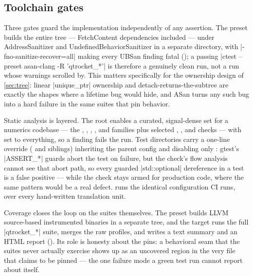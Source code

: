 \subsection{Toolchain gates}\label{sec:verification-toolchain}

Three gates guard the implementation independently of any assertion. The  preset
builds the entire tree --- FetchContent dependencies included --- under
AddressSanitizer and UndefinedBehaviorSanitizer in a separate  directory, with
\cppinline|-fno-sanitize-recover=all| making every UBSan finding fatal
(); a passing \cppinline|ctest --preset asan-clang -R 'qtrocket_*'| is
therefore a genuinely clean run, not a run whose warnings scrolled by. This matters specifically
for the ownership design of \cref{sec:tree}: linear \cppinline|unique_ptr| ownership and
detach-returns-the-subtree are exactly the shapes where a lifetime bug would hide, and ASan turns
any such bug into a hard failure in the same suites that pin behavior.

Static analysis is layered. The root  enables a curated, signal-dense set for a
numerics codebase --- the , , ,
, and  families plus selected ,
, and  checks --- with  set to everything, so a finding fails
the run. Test directories carry a one-line override ( and siblings)
inheriting the parent config and disabling only :
gtest's \cppinline|ASSERT_*| guards abort the test on failure, but the check's flow analysis
cannot see that abort path, so every guarded \cppinline|std::optional| dereference in a test is a
false positive --- while the check stays armed for production code, where the same pattern would
be a real defect.  runs the identical configuration CI runs, over every
hand-written translation unit.

Coverage closes the loop on the suites themselves. The  preset builds
LLVM source-based instrumented binaries in a separate  tree, and the
 target runs the full \cppinline|qtrocket_*| suite, merges the raw profiles, and
writes a text summary and an HTML report (). Its role is
honesty about the pins: a behavioral seam that the suites never actually exercise shows up as an
uncovered region in the very file that claims to be pinned --- the one failure mode a green test
run cannot report about itself.
